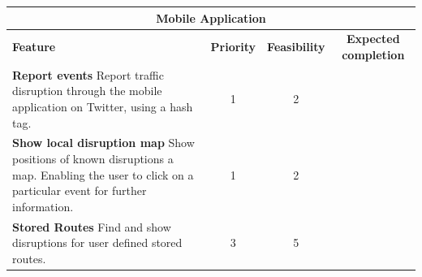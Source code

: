 \begin{center}
\begin{tabular}{ | p{6cm} | c | c | c | }
\hline
\multicolumn{4}{|c|}{\textbf{Mobile Application}} \\ \hline
\textbf{Feature} & \textbf{Priority} & \textbf{Feasibility} & \textbf{Expected completion} \\ \hline
\textbf{Report events}\newline
Report traffic disruption through the mobile application on Twitter, using a hash tag. & 1 & 2 & \\ \hline
\textbf{Show local disruption map}\newline
Show positions of known disruptions a map. Enabling the user to click on a particular event for further information. & 1 & 2 & \\ \hline
\textbf{Stored Routes}\newline
Find and show disruptions for user defined stored routes. & 3 & 5 & \\ \hline
\end{tabular}
\end{center}